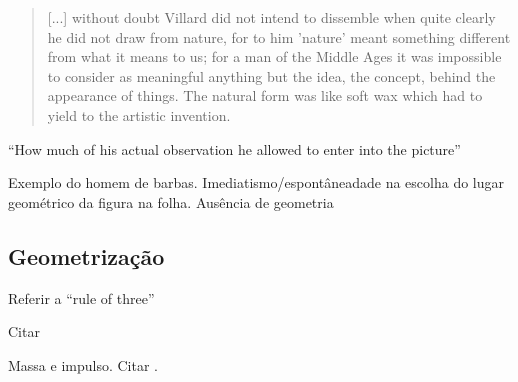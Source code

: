 \documentclass{article}
\begin{document}
\begin{quote}
  [...] without doubt Villard did not intend to dissemble when quite
  clearly he did not draw from nature, for to him 'nature' meant
  something different from what it means to us; for a man of the
  Middle Ages it was impossible to consider as meaningful anything but
  the idea, the concept, behind the appearance of things. The natural
  form was like soft wax which had to yield to the artistic
  invention.
\end{quote}

\cite{gombrich} ``How much of his actual observation he allowed to
enter into the picture''

Exemplo do homem de barbas. Imediatismo/espontâneadade na escolha do
lugar geométrico da figura na folha. Ausência de geometria 

\subsection{Geometrização}

Referir a ``rule of three''

Citar \cite{gombrich}

Massa e impulso. Citar \cite{tavora}.
\end{document}
